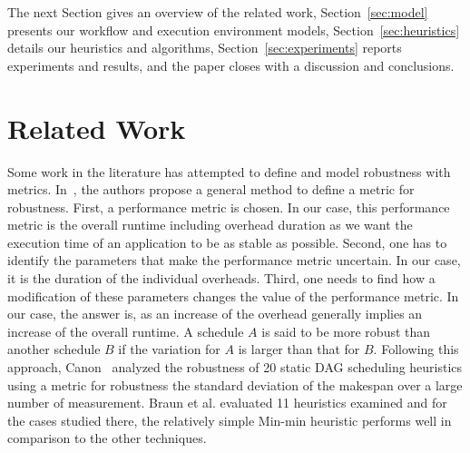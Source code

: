 The next Section gives an overview of the related work, Section~\ref{sec:model} presents our workflow and execution environment models, Section~\ref{sec:heuristics} details our heuristics and algorithms, Section~\ref{sec:experiments} reports experiments and results, and the paper closes with a discussion and conclusions.

\section{Related Work}
\label{related}


Some work in the literature has attempted to define and model robustness with metrics. In~\cite{Ali2004}, the authors propose a general method to define a metric for robustness. First, a performance metric is chosen. In our case, this performance metric is the overall runtime including overhead duration as we want the execution time of an application to be as stable as possible. Second, one has to identify the parameters that make the performance metric uncertain. In our case, it is the duration of the individual overheads. Third, one needs to find how a modification of these parameters changes the value of the performance metric. In our case, the answer is, as an increase of the overhead generally implies an increase of the overall runtime. 
A schedule $A$ is said to be more robust than another schedule $B$ if the variation for $A$ is larger than that for $B$.
Following this approach, Canon~\cite{Canon2008} analyzed the robustness of 20 static DAG scheduling heuristics using a metric for robustness the standard deviation of the makespan over a large number of measurement. Braun et al. \cite{Braun2001} evaluated 11 heuristics examined and for the cases studied there, the relatively simple Min-min heuristic performs well in comparison to the other techniques. 

